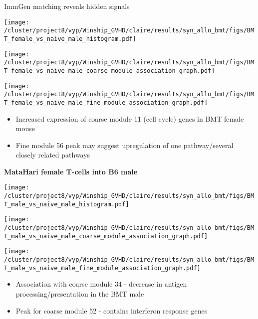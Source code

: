 \documentclass[final,hyperref={pdfpagelabels=false}]{beamer}
\begin{document}
\begin{frame}{}
\begin{columns}[t]
\begin{column}{.36\linewidth}
\begin{block}{ImmGen matching reveals hidden signals}
      \begin{minipage}{0.30\textwidth}
        \texttt{[image: /cluster/project8/vyp/Winship\_GVHD/claire/results/syn\_allo\_bmt/figs/BMT\_female\_vs\_naive\_male\_histogram.pdf]}
      \end{minipage}
  \hfill 
\begin{minipage}{0.30\textwidth}
        \texttt{[image: /cluster/project8/vyp/Winship\_GVHD/claire/results/syn\_allo\_bmt/figs/BMT\_female\_vs\_naive\_male\_coarse\_module\_association\_graph.pdf]}
      \end{minipage}
\hfill
\begin{minipage}{0.30\textwidth}
        \texttt{[image: /cluster/project8/vyp/Winship\_GVHD/claire/results/syn\_allo\_bmt/figs/BMT\_female\_vs\_naive\_male\_fine\_module\_association\_graph.pdf]}
      \end{minipage}
\begin{itemize}
\item Increased expression of coarse module 11 (cell cycle) genes in BMT female mouse 
\item Fine module 56 peak may suggest upregulation of one pathway/several closely related pathways 
\end{itemize}
\vspace{1.5cm}

{\bf MataHari female T-cells into B6 male}
\vfill
\begin{minipage}{0.30\textwidth}
        \texttt{[image: /cluster/project8/vyp/Winship\_GVHD/claire/results/syn\_allo\_bmt/figs/BMT\_male\_vs\_naive\_male\_histogram.pdf]}
      \end{minipage}
  \hfill
      \begin{minipage}{0.30\textwidth}
        \texttt{[image: /cluster/project8/vyp/Winship\_GVHD/claire/results/syn\_allo\_bmt/figs/BMT\_male\_vs\_naive\_male\_coarse\_module\_association\_graph.pdf]}
      \end{minipage}
  \hfill
  \begin{minipage}{0.30\textwidth}
        \texttt{[image: /cluster/project8/vyp/Winship\_GVHD/claire/results/syn\_allo\_bmt/figs/BMT\_male\_vs\_naive\_male\_fine\_module\_association\_graph.pdf]}
  \end{minipage}
  \hfill
  \begin{itemize}
  \item Association with coarse module 34 - decrease in antigen processing/presentation in the BMT male
  \item Peak for coarse module 52 - contains interferon response genes  
    \end{itemize}
\end{block}
\vspace{1.5cm}


\end{column}
\end{columns}
\end{frame}
\end{document}
